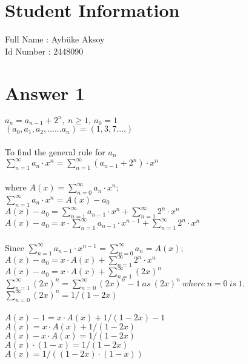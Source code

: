 \documentclass[12pt]{article}
\begin{document}
\section*{Student Information } 
Full Name : Aybüke Aksoy \\
Id Number : 2448090 \\

\section*{Answer 1}
$a_n=a_{n-1}+2^n , \ n \geq 1, \ a_0=1$\\
$(a_0,a_1,a_2,......a_n)=(1,3,7....)$\\\\
To find the general rule for
$a_n$\\
$\sum_{n=1}^{\infty} a_n \cdot x^n=\sum_{n=1}^{\infty} (a_{n-1} + 2^n) \cdot x^n$\\\\
where 
$A(x)=\sum_{n=0}^{\infty} a_n \cdot x^n;$\\
$\sum_{n=1}^{\infty} a_n \cdot x^n=A(x)-a_0$\\
$A(x)-a_0=\sum_{n=1}^{\infty} a_{n-1} \cdot x^n + \sum_{n=1}^{\infty} 2^n \cdot x^n$\\
$A(x)-a_0=x \cdot \sum_{n=1}^{\infty} a_{n-1} \cdot x^{n-1} + \sum_{n=1}^{\infty} 2^n \cdot x^n$\\\\
Since 
$\sum_{n=1}^{\infty} a_{n-1} \cdot x^{n-1}=\sum_{n=0}^{\infty} a_n=A(x);$\\
$A(x)-a_0=x \cdot A(x)+ \sum_{n=1}^{\infty} 2^n \cdot x^n$\\
$A(x)-a_0=x \cdot A(x)+ \sum_{n=1}^{\infty} (2x)^n$\\
$\sum_{n=1}^{\infty} (2x)^n=\sum_{n=0}^{\infty} (2x)^n-1 \ as \ (2x)^n \ where \ n=0 \ is \ 1.$\\
$\sum_{n=0}^{\infty} (2x)^n=1/(1-2x)$\\\\
$A(x)-1=x \cdot A(x) + 1/(1-2x) -1$\\
$A(x)=x \cdot A(x) + 1/(1-2x)$\\
$A(x)-x \cdot A(x) = 1/(1-2x)$\\
$A(x) \cdot (1-x)=1/(1-2x)$\\
$A(x)=1/((1-2x) \cdot (1-x))$\\\\
\end{document}
